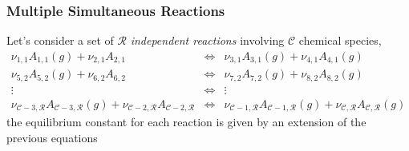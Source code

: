 \documentclass[10pt,compress,unknownkeysallowed]{beamer}
\begin{document}
\begin{frame}
  \frametitle{Multiple Simultaneous Reactions}
      Let's consider a set of $\mathcal{R}$ {\it independent reactions} involving $\mathcal{C}$ chemical species, 
               \begin{eqnarray}
                     \nu_{1,1}A_{1,1} (g) + \nu_{2,1}A_{2,1} &\Longleftrightarrow& \nu_{3,1}A_{3,1} (g) + \nu_{4,1}A_{4,1} (g) \nonumber\\
                     \nu_{5,2}A_{5,2} (g) + \nu_{6,2}A_{6,2} &\Longleftrightarrow& \nu_{7,2}A_{7,2} (g) + \nu_{8,2}A_{8,2} (g)  \nonumber\\
                                 \vdots               &\Longleftrightarrow&     \vdots                         \nonumber\\
                     \nu_{\mathcal{C}-3,\mathcal{R}}A_{\mathcal{C}-3,\mathcal{R}} (g) + \nu_{\mathcal{C}-2,\mathcal{R}}A_{\mathcal{C}-2,\mathcal{R}} &\Longleftrightarrow& \nu_{\mathcal{C}-1,\mathcal{R}}A_{\mathcal{C}-1,\mathcal{R}} (g) + \nu_{\mathcal{C},\mathcal{R}}A_{\mathcal{C},\mathcal{R}} (g) \nonumber
               \end{eqnarray}
      the equilibrium constant for each reaction is given by an extension of the previous equations


\end{frame}
\normalsize
\end{document}
